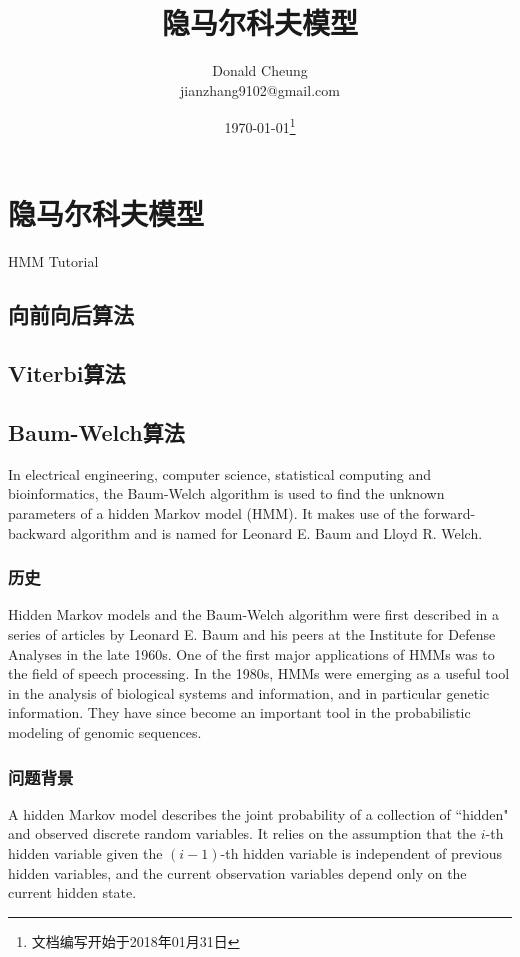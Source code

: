 \ifx\mlbook\undefined
    \providecommand{\pathroot}{../..}

    \title{隐马尔科夫模型}
    \author{Donald Cheung\\jianzhang9102@gmail.com}
    \date{\today\footnote{文档编写开始于2018年01月31日}}

    
\fi

\chapter{隐马尔科夫模型}

HMM Tutorial\cite{Rabiner:HMMTutorial}

\section{向前向后算法}

\section{Viterbi算法}

\section{Baum-Welch算法}
In electrical engineering, computer science, statistical computing and bioinformatics, the Baum-Welch algorithm is used to find the unknown parameters of a hidden Markov model (HMM). It makes use of the forward-backward algorithm and is named for Leonard E. Baum and Lloyd R. Welch.

\subsection{历史}
Hidden Markov models and the Baum-Welch algorithm were first described in a series of articles by Leonard E. Baum and his peers at the Institute for Defense Analyses in the late 1960s. One of the first major applications of HMMs was to the field of speech processing. In the 1980s, HMMs were emerging as a useful tool in the analysis of biological systems and information, and in particular genetic information. They have since become an important tool in the probabilistic modeling of genomic sequences.

\subsection{问题背景}
A hidden Markov model describes the joint probability of a collection of ``hidden" and observed discrete random variables.
It relies on the assumption that the $i$-th hidden variable given the $(i-1)$-th hidden variable is independent of previous hidden variables, and the current observation variables depend only on the current hidden state.

